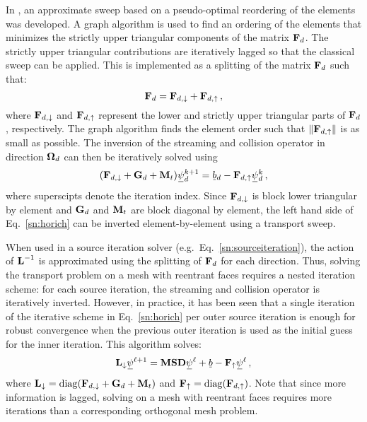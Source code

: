 \documentclass[../doc.tex]{subfiles}
\begin{document}
In \textcite{graph_sweeps}, an approximate sweep based on a pseudo-optimal reordering of the elements was developed. A graph algorithm is used to find an ordering of the elements that minimizes the strictly upper triangular components of the matrix $\boldsymbol{\mathrm{F}}_d$. The strictly upper triangular contributions are iteratively lagged so that the classical sweep can be applied. This is implemented as a splitting of the matrix $\boldsymbol{\mathrm{F}}_d$ such that: 
	\begin{equation}
		\boldsymbol{\mathrm{F}}_d = \boldsymbol{\mathrm{F}}_{d,\downarrow} + \boldsymbol{\mathrm{F}}_{d,\uparrow} \,,
	\end{equation}
where $\boldsymbol{\mathrm{F}}_{d,\downarrow}$ and $\boldsymbol{\mathrm{F}}_{d,\uparrow}$ represent the lower and strictly upper triangular parts of $\boldsymbol{\mathrm{F}}_d$, respectively. The graph algorithm finds the element order such that $\|\boldsymbol{\mathrm{F}}_{d,\uparrow}\|$ is as small as possible. The inversion of the streaming and collision operator in direction $\boldsymbol{\Omega}_d$ can then be iteratively solved using 
	\begin{equation} \label{sn:horich}
		(\mat{F}_{d,\downarrow} + \mat{G}_d + \mat{M}_t)\ubar{\psi}_d^{k+1} = \ubar{b}_d - \mat{F}_{d,\uparrow}\ubar{\psi}_d^{k} \,,
	\end{equation}
where superscipts denote the iteration index. Since $\boldsymbol{\mathrm{F}}_{d,\downarrow}$ is block lower triangular by element and $\boldsymbol{\mathrm{G}}_d$ and $\boldsymbol{\mathrm{M}}_t$ are block diagonal by element, the left hand side of Eq.~\ref{sn:horich} can be inverted element-by-element using a transport sweep. 

When used in a source iteration solver (e.g.~Eq.~\ref{sn:sourceiteration}), the action of $\boldsymbol{\mathrm{L}}^{-1}$ is approximated using the splitting of $\boldsymbol{\mathrm{F}}_d$ for each direction. Thus, solving the transport problem on a mesh with reentrant faces requires a nested iteration scheme: for each source iteration, the streaming and collision operator is iteratively inverted. However, in practice, it has been seen that a single iteration of the iterative scheme in Eq.~\ref{sn:horich} per outer source iteration is enough for robust convergence when the previous outer iteration is used as the initial guess for the inner iteration. This algorithm solves:
	\begin{equation}
		\mat{L}_{\downarrow} \ubar{\psi}^{\ell+1} = \mat{M}\mat{S}\mat{D}\ubar{\psi}^\ell + \ubar{b} - \mat{F}_{\uparrow} \ubar{\psi}^\ell \,, 
	\end{equation}
where $\boldsymbol{\mathrm{L}}_{\downarrow} = \operatorname{diag}(\boldsymbol{\mathrm{F}}_{d,\downarrow} + \boldsymbol{\mathrm{G}}_d + \boldsymbol{\mathrm{M}}_t)$ and $\boldsymbol{\mathrm{F}}_{\uparrow} = \operatorname{diag}(\boldsymbol{\mathrm{F}}_{d,\uparrow})$. 
Note that since more information is lagged, solving on a mesh with reentrant faces requires more iterations than a corresponding orthogonal mesh problem. 
\end{document}
